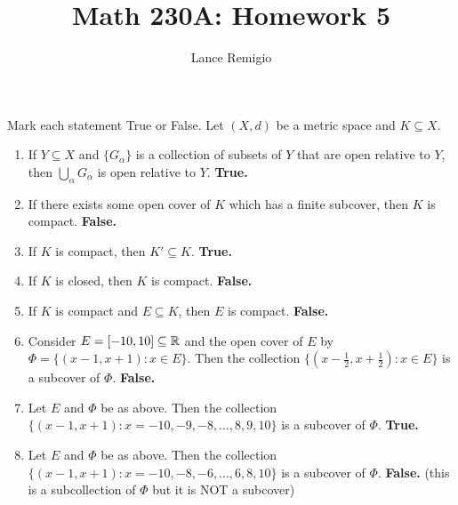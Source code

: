 \documentclass[a4paper]{article}
\title{Math 230A: Homework 5}
\author{Lance Remigio}
\begin{document}
\maketitle    
{}
\rhead{\thepage}

\begin{problem}
   Mark each statement True or False. Let \( (X,d) \) be a metric space and \( K \subseteq X  \). 
   \begin{enumerate}
       \item If \( Y \subseteq X   \) and \( \{ {G}_{\alpha} \}  \) is a collection of subsets of \( Y  \) that are open relative to \( Y  \), then \( \bigcup_{ \alpha }^{  } {G}_{\alpha} \) is open relative to \( Y  \). \textbf{True.}
        \item If there exists some open cover of \( K   \) which has a finite subcover, then \( K  \) is compact. \textbf{False.}
        \item If \( K  \) is compact, then \( K' \subseteq K  \). \textbf{True.}
        \item If \( K  \) is closed, then \( K  \) is compact. \textbf{False.}
        \item If \( K  \) is compact and \( E \subseteq K \), then \( E  \) is compact. \textbf{False.}
        \item Consider \( E = [-10,10] \subseteq \mathbb{R}  \) and the open cover of \( E  \) by \( \Phi = \{ (x-1,x + 1) : x \in E  \}  \). Then the collection \( \{ (x - \frac{ 1 }{ 2 }  , x + \frac{ 1 }{ 2 } ) : x \in E  \}  \) is a subcover of \( \Phi \). \textbf{False.}
        \item Let \( E  \) and \( \Phi \) be as above. Then the collection \( \{ (x-1, x+1): x = -10,-9,-8, \dots, 8, 9, 10 \}  \) is a subcover of \( \Phi \). \textbf{True.}
        \item Let \( E  \) and \( \Phi \) be as above. Then the collection \( \{ (x-1, x+1): x = -10,-8, -6, \dots, 6, 8, 10 \}  \) is a subcover of \( \Phi \). \textbf{False.} (this is a subcollection of \( \Phi  \) but it is NOT a subcover)
   \end{enumerate}
\end{problem}
\end{document}
